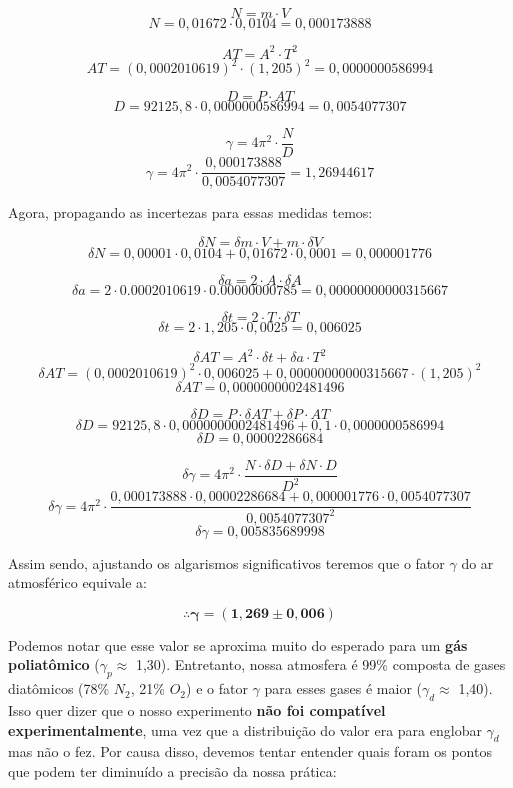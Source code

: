 \[ N = m \cdot V \]
\[ N = 0,01672 \cdot 0,0104 = 0,000173888 \]

\[ AT = A^2 \cdot T^2 \]
\[ AT =(0,0002010619)^2 \cdot (1,205)^2 = 0,0000000586994 \]

\[ D = P \cdot AT \]
\[ D = 92125,8 \cdot 0,0000000586994 = 0,0054077307 \]

\[ \gamma = 4\pi^2 \cdot \frac{N}{D} \]
\[ \gamma = 4\pi^2 \cdot \frac{0,000173888}{0,0054077307} = 1,26944617 \]

Agora, propagando as incertezas para essas medidas temos:

\[ \delta N = \delta m \cdot V + m \cdot \delta V \]
\[ \delta N = 0,00001 \cdot 0,0104 + 0,01672 \cdot 0,0001 = 0,000001776 \]

\[ \delta a = 2 \cdot A \cdot \delta A \]
\[ \delta a = 2 \cdot 0.0002010619 \cdot 0.00000000785 = 0,00000000000315667 \]

\[ \delta t = 2 \cdot T \cdot \delta T \]
\[ \delta t = 2 \cdot 1,205 \cdot 0,0025 = 0,006025 \]

\[ \delta AT = A^2 \cdot \delta t + \delta a \cdot T^2 \]
\[ \delta AT = (0,0002010619)^2 \cdot 0,006025 + 0,00000000000315667 \cdot (1,205)^2 \]
\[ \delta AT = 0,0000000002481496 \]

\[ \delta D = P \cdot \delta AT + \delta P \cdot AT \]
\[ \delta D = 92125,8 \cdot 0,0000000002481496 + 0,1 \cdot 0,0000000586994 \]
\[ \delta D = 0,00002286684 \]

\[ \delta \gamma = 4\pi^2 \cdot \frac{N \cdot \delta D + \delta N \cdot D}{D^2} \]
\[ \delta \gamma = 4\pi^2 \cdot \frac{0,000173888 \cdot 0,00002286684 + 0,000001776 \cdot 0,0054077307}{0,0054077307^2} \]
\[ \delta \gamma = 0,005835689998 \]

Assim sendo, ajustando os algarismos significativos teremos que o fator $\gamma$ do ar atmosférico equivale a:

\[ \therefore \mathbf{\gamma = (1,269 \pm 0,006)} \]

Podemos notar que esse valor se aproxima muito do esperado para um \textbf{gás poliatômico} ($\gamma_p \approx$ 1,30). Entretanto, nossa atmosfera é 99\% composta de gases diatômicos (78\% $N_2$, 21\% $O_2$) e o fator $\gamma$ para esses gases é maior ($\gamma_d \approx$ 1,40).\\

Isso quer dizer que o nosso experimento \textbf{não foi compatível experimentalmente}, uma vez que a distribuição do valor era para englobar $\gamma_d$ mas não o fez. Por causa disso, devemos tentar entender quais foram os pontos que podem ter diminuído a precisão da nossa prática: 

